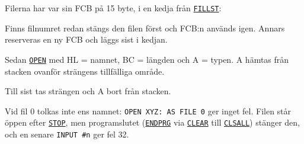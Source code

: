 \begin{Listing}
\begin{Note}
\par\noindent Filerna har var sin FCB på 15 byte, i en kedja från \hyperlink{v:FILLST}{\texttt{FILLST}}:\par
\begin{Verb}
\end{Verb}
\par\noindent Finns filnumret redan stängs den filen först och FCB:n används igen. Annars reserveras en ny FCB och läggs sist i kedjan.\par
\par\noindent Sedan \hyperlink{l:OPEN}{\texttt{OPEN}} med HL = namnet, BC = längden och A = typen. A hämtas från stacken ovanför strängens tillfälliga område.\par
\par\noindent Till sist tas strängen och A bort från stacken.\par
\par\noindent Vid fil 0 tolkas inte ens namnet: \texttt{OPEN {}XYZ:{} AS FILE 0} ger inget fel. Filen står öppen efter \hyperlink{l:STOP}{\texttt{STOP}}, men programslutet (\hyperlink{l:ENDPRG}{\texttt{ENDPRG}} via \hyperlink{l:CLEAR}{\texttt{CLEAR}} till \hyperlink{l:CLSALL}{\texttt{CLSALL}}) stänger den, och en senare \texttt{INPUT \#n} ger fel 32.\par\end{Note}
\Gap
{}

\end{Listing}
